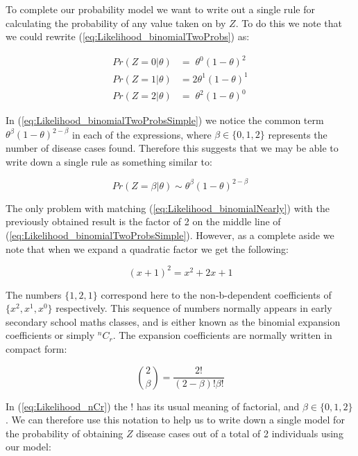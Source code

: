 \documentclass[11pt,fullpage]{book}
\begin{document}
To complete our probability model we want to write out a single rule for calculating the probability of any value taken on by $Z$. To do this we note that we could rewrite (\ref{eq:Likelihood_binomialTwoProbs}) as:

\begin{equation}\label{eq:Likelihood_binomialTwoProbsSimple}
\begin{align}
Pr(Z = 0|\theta)& = \;\theta^0(1-\theta)^2\\
Pr(Z = 1|\theta)& = 2\theta^1(1-\theta)^1\\
Pr(Z = 2|\theta)& = \;\theta^2(1-\theta)^0
\end{align}
\end{equation}

In (\ref{eq:Likelihood_binomialTwoProbsSimple}) we notice the common term $\theta^\beta (1-\theta)^{2-\beta}$ in each of the expressions, where $\beta\in\{0,1,2\}$ represents the number of disease cases found. Therefore this suggests that we may be able to write down a single rule as something similar to:

\begin{equation}\label{eq:Likelihood_binomialNearly}
Pr(Z = \beta|\theta) \sim \theta^\beta(1-\theta)^{2-\beta}
\end{equation}

The only problem with matching (\ref{eq:Likelihood_binomialNearly}) with the previously obtained result is the factor of 2 on the middle line of (\ref{eq:Likelihood_binomialTwoProbsSimple}). However, as a complete aside we note that when we expand a quadratic factor we get the following:

\begin{equation}\label{eq:Likelihood_quadratic}
(x+1)^2 = x^2 + 2x + 1
\end{equation}

The numbers $\{1,2,1\}$ correspond here to the non-b-dependent coefficients of $\{x^2,x^1,x^0\}$ respectively. This sequence of numbers normally appears in early secondary school maths classes, and is either known as the binomial expansion coefficients or simply $^nC_r$. The expansion coefficients are normally written in compact form:

\begin{equation}\label{eq:Likelihood_nCr}
{2 \choose \beta} = \frac{2!}{(2-\beta)!\beta!}
\end{equation}

In (\ref{eq:Likelihood_nCr}) the $!$ has its usual meaning of factorial, and $\beta\in\{0,1,2\}$. We can therefore use this notation to help us to write down a single model for the probability of obtaining $Z$ disease cases out of a total of 2 individuals using our model:
\end{document}
